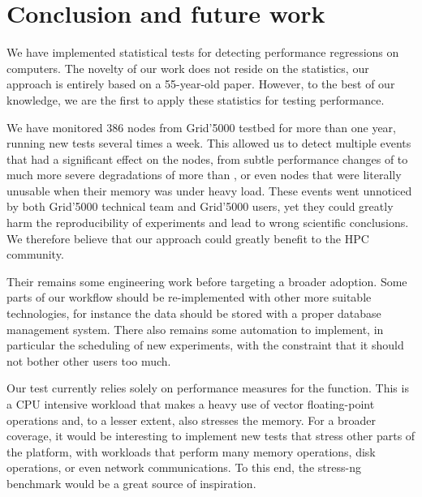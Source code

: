     \section{Conclusion and future work}%
    \label{sec:test:conclusion}

        We have implemented statistical tests for detecting performance regressions on computers. The novelty of our
        work does not reside on the statistics, our approach is entirely based on a 55-year-old paper. However, to the
        best of our knowledge, we are the first to apply these statistics for testing performance.

        We have monitored 386 nodes from Grid'5000 testbed for more than one year, running new tests several times a
        week. This allowed us to detect multiple events that had a significant effect on the nodes, from subtle
        performance changes of  to much more severe degradations of more than , or
        even nodes that were literally unusable when their memory was under heavy load. These events went unnoticed by
        both Grid'5000 technical team and Grid'5000 users, yet they could greatly harm the reproducibility of
        experiments and lead to wrong scientific conclusions. We therefore believe that our approach could greatly
        benefit to the HPC community.

        Their remains some engineering work before targeting a broader adoption. Some parts of our workflow should be
        re-implemented with other more suitable technologies, for instance the data should be stored with a proper
        database management system. There also remains some automation to implement, in particular the scheduling of
        new experiments, with the constraint that it should not bother other users too much.

        Our test currently relies solely on performance measures for the \dgemm function. This is a CPU intensive
        workload that makes a heavy use of vector floating-point operations and, to a lesser extent, also stresses the
        memory. For a broader coverage, it would be interesting to implement new tests that stress other parts of the
        platform, \eg with workloads that perform many memory operations, disk operations, or even network
        communications. To this end, the stress-ng~\cite{stress-ng} benchmark would be a great source of inspiration.
